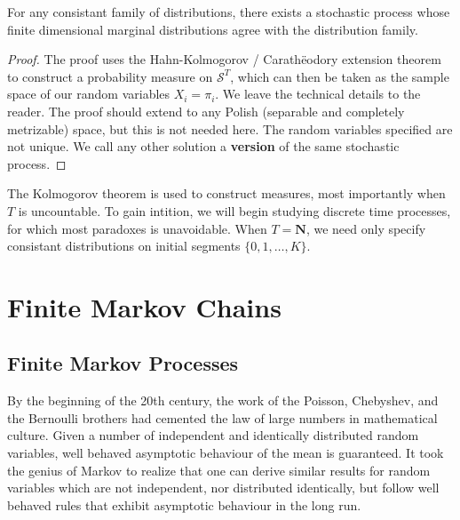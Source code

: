 \begin{theorem}
    For any consistant family of distributions, there exists a stochastic process whose finite dimensional marginal distributions agree with the distribution family.
\end{theorem}
\begin{proof}
    The proof uses the Hahn-Kolmogorov / Carath\"{e}odory extension theorem to construct a probability measure on $\mathcal{S}^T$, which can then be taken as the sample space of our random variables $X_i = \pi_i$. We leave the technical details to the reader. The proof should extend to any Polish (separable and completely metrizable) space, but this is not needed here. The random variables specified are not unique. We call any other solution a {\bf version} of the same stochastic process.
\end{proof}

The Kolmogorov theorem is used to construct measures, most importantly when $T$ is uncountable. To gain intition, we will begin studying discrete time processes, for which most paradoxes is unavoidable. When $T = \mathbf{N}$, we need only specify consistant distributions on initial segments $\{ 0, 1, \dots, K \}$.

\chapter{Finite Markov Chains}

\section{Finite Markov Processes}

By the beginning of the 20th century, the work of the Poisson, Chebyshev, and the Bernoulli brothers had cemented the law of large numbers in mathematical culture. Given a number of independent and identically distributed random variables, well behaved asymptotic behaviour of the mean is guaranteed. It took the genius of Markov to realize that one can derive similar results for random variables which are not independent, nor distributed identically, but follow well behaved rules that exhibit asymptotic behaviour in the long run.

